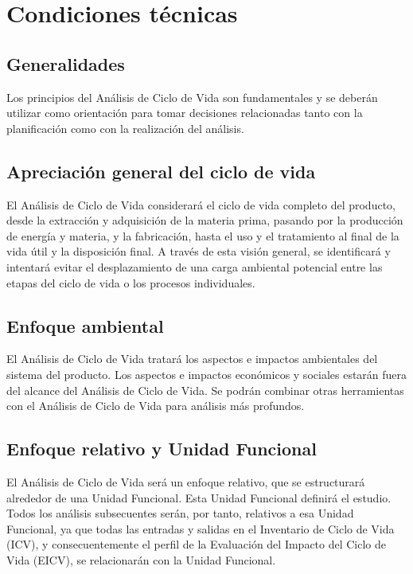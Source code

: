 
\setcounter{chapter}{0}
\chapter{Condiciones técnicas}

\section{Generalidades}

Los principios del Análisis de Ciclo de Vida son fundamentales y se deberán utilizar como orientación para tomar decisiones relacionadas tanto con la planificación como con la realización del análisis.

\section{Apreciación general del ciclo de vida}

El Análisis de Ciclo de Vida considerará el ciclo de vida completo del producto, desde la extracción y adquisición de la materia prima, pasando por la producción de energía y materia, y la fabricación, hasta el uso y el tratamiento al final de la vida útil y la disposición final. A través de esta visión general, se identificará y intentará evitar el desplazamiento de una carga ambiental potencial entre las etapas del ciclo de vida o los procesos individuales.

\section{Enfoque ambiental}
El Análisis de Ciclo de Vida tratará los aspectos e impactos ambientales del sistema del producto. Los aspectos e impactos económicos y sociales estarán fuera del alcance del Análisis de Ciclo de Vida. Se podrán combinar otras herramientas con el Análisis de Ciclo de Vida para análisis más profundos.

\section{Enfoque relativo y Unidad Funcional}
El Análisis de Ciclo de Vida será un enfoque relativo, que se estructurará alrededor de una Unidad Funcional. Esta Unidad Funcional definirá el estudio. Todos los análisis subsecuentes serán, por tanto, relativos a esa Unidad Funcional, ya que todas las entradas y salidas en el Inventario de Ciclo de Vida (ICV), y consecuentemente el perfil de la Evaluación del Impacto del Ciclo de Vida (EICV), se relacionarán con la Unidad Funcional.

